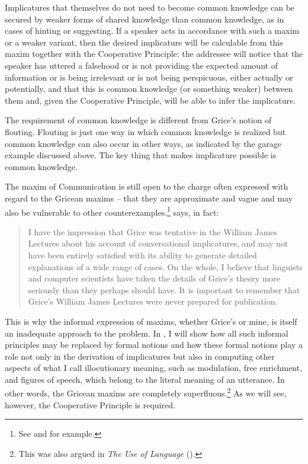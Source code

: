 \noindent Implicatures that themselves do not need to become common knowledge can be secured by weaker forms of shared knowledge than common knowledge, as in cases of hinting or suggesting. If a speaker acts in accordance with such a maxim or a weaker variant, then the desired implicature will be calculable from this maxim together with the Cooperative Principle: the addressee will notice that the speaker has uttered a falsehood or is not providing the expected amount of information or is being irrelevant or is not being perspicuous, either actually or potentially, and that this is common knowledge (or something weaker) between them and, given the Cooperative Principle, will be able to infer the implicature.

The requirement of common knowledge is different from Grice's notion of flouting. Flouting is just one way in which common knowledge is realized but common knowledge can also occur in other ways, as indicated by the garage example discussed above. The key thing that makes implicature possible is common knowledge.

The maxim of Communication is still open to the charge often expressed with regard to the Gricean maxims -- that they are approximate and vague and may also be vulnerable to other counterexamples.\footnote{See \citet{horn:sploe, horn:qr} and \citet{levinson:pragmatics, levinson:pm} for example.} \citet[footnote 32]{thomason:ami} says, in fact: 

\begin{quote}

I have the impression that Grice was tentative in the William James Lectures about his account of conversational implicatures, and may not have been entirely satisfied with its ability to generate detailed explanations of a wide range of cases. On the whole, I believe that linguists and computer scientists have taken the details of Grice's theory more seriously than they perhaps should have. It is important to remember that Grice's William James Lectures were never prepared for publication.

\end{quote}

\noindent This is why the informal expression of maxims, whether Grice's or mine, is itself an inadequate approach to the problem. In , I will show how all such informal principles may be replaced by formal notions and how these formal notions play a role not only in the derivation of implicatures but also in computing other aspects of what I call illocutionary meaning, such as modulation, free enrichment, and figures of speech, which belong to the literal meaning of an utterance. In other words, the Gricean maxims are completely superfluous.\footnote{This was also argued in \emph{The Use of Language} (\citeyear[Chapter~7]{parikh:ul}).} As we will see, however, the Cooperative Principle is required.

